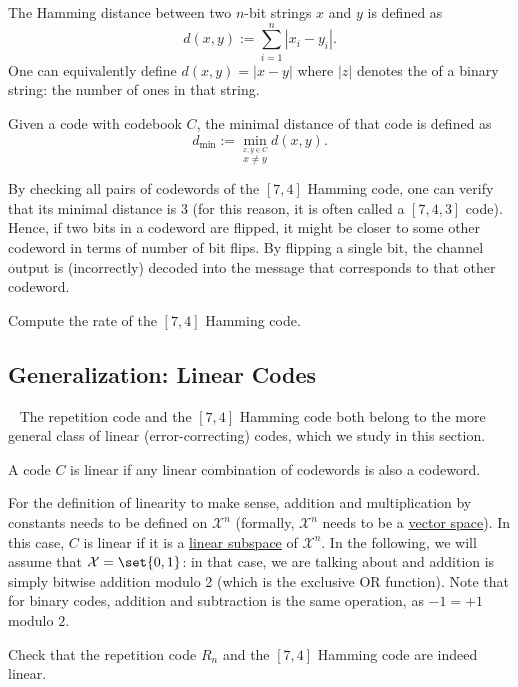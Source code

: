 \begin{definition}
The Hamming distance between two $n$-bit strings $x$ and $y$ is defined as
\[
d(x,y) := \sum_{i=1}^n |x_i - y_i|. 
\]
One can equivalently define $d(x,y) = |x-y|$ where $|z|$ denotes the  of a binary string: the number of ones in that string.
\end{definition}

\begin{definition}
Given a code with codebook $C$, the minimal distance of that code is defined as
\[
d_{\min} := \min_{\stackrel{x,y \in C}{x \neq y}} d(x,y).
\]
\end{definition}
By checking all pairs of codewords of the $[7,4]$ Hamming code, one can verify that its minimal distance is 3 (for this reason, it is often called a $[7,4,3]$ code). Hence, if two bits in a codeword are flipped, it might be closer to some other codeword in terms of number of bit flips. By flipping a single bit, the channel output is (incorrectly) decoded into the message that corresponds to that other codeword.

\begin{exercise}
Compute the rate of the $[7,4]$ Hamming code.
\end{exercise}




\subsection{Generalization: Linear Codes}~\label{sec:linear-codes}
The repetition code and the $[7,4]$ Hamming code both belong to the more general class of linear (error-correcting) codes, which we study in this section.

\begin{definition}
A code $C$ is linear if any linear combination of codewords is also a codeword.
\end{definition}
For the definition of linearity to make sense, addition and multiplication by constants needs to be defined on $\mathcal{X}^n$ (formally, $\mathcal{X}^n$ needs to be a \href{https://en.wikipedia.org/wiki/Vector_space}{vector space}). In this case, $C$ is linear if it is a \href{https://en.wikipedia.org/wiki/Linear_subspace}{linear subspace} of $\mathcal{X}^n$.
In the following, we will assume that $\mathcal{X} = \set{0,1}$: in that case, we are talking about  and addition is simply bitwise addition modulo 2 (which is the exclusive OR function). Note that for binary codes, addition and subtraction is the same operation, as $-1 = +1$ modulo $2$.
\begin{exercise}
Check that the repetition code $R_n$ and the $[7,4]$ Hamming code are indeed linear.
\end{exercise}

